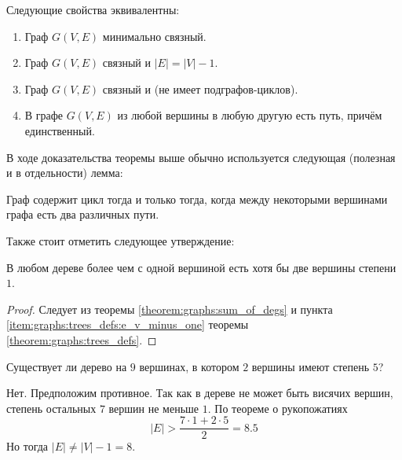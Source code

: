 \begin{theorem}
    \label{theorem:graphs:trees_defs}
    Следующие свойства эквивалентны:
    \begin{enumerate}[label=(\arabic*)]
        \item
            \label{item:graphs:trees_defs:min_connected}
            Граф $ G(V,E) $ минимально связный.
        \item
            \label{item:graphs:trees_defs:e_v_minus_one}
            Граф $ G(V,E) $ связный и $ |E| = |V| - 1 $.
        \item
            \label{item:graphs:trees_defs:acyclic}
            Граф $ G(V,E) $ связный и  (не имеет подграфов-циклов).
        \item
            \label{item:graphs:trees_defs:two_paths}
            В графе $ G(V,E) $ из любой вершины в любую другую есть путь, причём единственный.
    \end{enumerate}
\end{theorem}

В ходе доказательства теоремы выше обычно используется следующая (полезная и в отдельности) лемма:
\begin{lemma}
    \label{lemma:graphs:cycle_two_paths}
    Граф содержит цикл тогда и только тогда, когда между некоторыми вершинами графа есть два различных пути.
\end{lemma}

Также стоит отметить следующее утверждение:
\begin{statement}
    \label{statement:graphs:leaf_in_every_tree}
    В любом дереве более чем с одной вершиной есть хотя бы две вершины степени $ 1 $.
\end{statement}

\begin{proof}
    Следует из теоремы \ref{theorem:graphs:sum_of_degs} и пункта \ref{item:graphs:trees_defs:e_v_minus_one} теоремы \ref{theorem:graphs:trees_defs}.
\end{proof}

\begin{Exercise}[counter=SecExercise, label={exercise:graphs:small_tree_big_deg}]
    \noindent
    Существует ли дерево на $ 9 $ вершинах, в котором $ 2 $ вершины имеют степень $ 5 $?
\end{Exercise}

\begin{Answer}
    \noindent
    Нет. Предположим противное.
    Так как в дереве не может быть висячих вершин, степень остальных $ 7 $ вершин не меньше $ 1 $.
    По теореме о рукопожатиях
    \[
        |E| > \frac{7 \cdot 1 + 2 \cdot 5}{2} = 8.5
    \]
    Но тогда $ |E| \neq |V| - 1 = 8 $.
\end{Answer}

